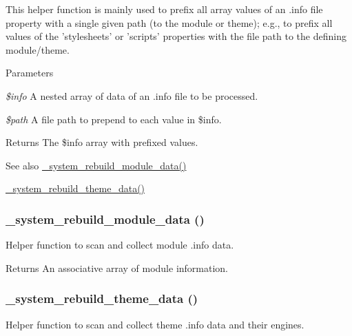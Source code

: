 This helper function is mainly used to prefix all array values of an .info file property with a single given path (to the module or theme); e.g., to prefix all values of the 'stylesheets' or 'scripts' properties with the file path to the defining module/theme.


\begin{DoxyParams}{Parameters}
\item[{\em \$info}]A nested array of data of an .info file to be processed. \item[{\em \$path}]A file path to prepend to each value in \$info.\end{DoxyParams}
\begin{DoxyReturn}{Returns}
The \$info array with prefixed values.
\end{DoxyReturn}
\begin{DoxySeeAlso}{See also}
\hyperlink{system_8module_aec98f44cde3933b35e0cb066d387c54c}{\_\-system\_\-rebuild\_\-module\_\-data()} 

\hyperlink{system_8module_ac3eaa9c509c1446605136070ddbf5016}{\_\-system\_\-rebuild\_\-theme\_\-data()} 
\end{DoxySeeAlso}
\hypertarget{system_8module_aec98f44cde3933b35e0cb066d387c54c}{
\subsubsection[{\_\-system\_\-rebuild\_\-module\_\-data}]{\setlength{\rightskip}{0pt plus 5cm}\_\-system\_\-rebuild\_\-module\_\-data ()}}
\label{system_8module_aec98f44cde3933b35e0cb066d387c54c}
Helper function to scan and collect module .info data.

\begin{DoxyReturn}{Returns}
An associative array of module information. 
\end{DoxyReturn}
\hypertarget{system_8module_ac3eaa9c509c1446605136070ddbf5016}{
\subsubsection[{\_\-system\_\-rebuild\_\-theme\_\-data}]{\setlength{\rightskip}{0pt plus 5cm}\_\-system\_\-rebuild\_\-theme\_\-data ()}}
\label{system_8module_ac3eaa9c509c1446605136070ddbf5016}
Helper function to scan and collect theme .info data and their engines.

